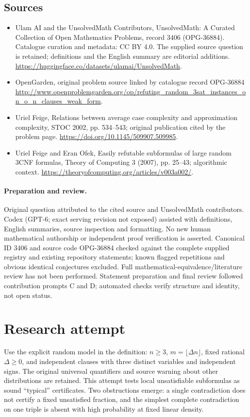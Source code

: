 \documentclass[11pt]{article}
\begin{document}
\subsection{Sources}
\begin{itemize}
\item[S1] Ulam AI and the UnsolvedMath Contributors, UnsolvedMath: A Curated Collection of Open Mathematics Problems, record 3406 (OPG-36884). Catalogue curation and metadata: CC BY 4.0. The supplied source question is retained; definitions and the English summary are editorial additions.
\url{https://huggingface.co/datasets/ulamai/UnsolvedMath}.
\item[S2] OpenGarden, original problem source linked by catalogue record OPG-36884
\url{http://www.openproblemgarden.org/op/refuting_random_3sat_instances_on_o_n_clauses_weak_form}.
\item[S3] Uriel Feige, Relations between average case complexity and approximation complexity, STOC 2002, pp. 534--543; original publication cited by the problem page.
\url{https://doi.org/10.1145/509907.509985}.
\item[S4] Uriel Feige and Eran Ofek, Easily refutable subformulas of large random 3CNF formulas, Theory of Computing 3 (2007), pp. 25--43; algorithmic context.
\url{https://theoryofcomputing.org/articles/v003a002/}.
\end{itemize}
\paragraph{Preparation and review.}
Original question attributed to the cited source and UnsolvedMath contributors. Codex (GPT-6; exact serving revision not exposed) assisted with definitions, English summaries, source inspection and formatting. No new human mathematical authorship or independent proof verification is asserted. Canonical ID 3406 and source code OPG-36884 checked against the complete supplied registry and existing repository statements; known flagged repetitions and obvious identical conjectures excluded. Full mathematical-equivalence/literature review has not been performed. Statement preparation and final review followed contribution prompts C and D; automated checks verify structure and identity, not open status.
\label{end:3406}


\section{Research attempt}
Use the explicit random model in the definition: $n\ge3$, $m=\lfloor\Delta n\rfloor$, fixed rational $\Delta\ge0$, and independent clauses with three distinct variables and independent signs. The original universal quantifiers and source warning about other distributions are retained. This attempt tests local unsatisfiable subformulas as sound ``typical'' certificates. Two obstructions emerge: a single contradiction does not certify a fixed unsatisfied fraction, and the simplest complete contradiction on one triple is absent with high probability at fixed linear density.
\end{document}

